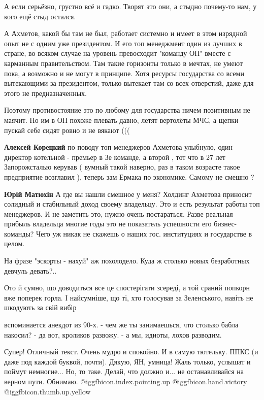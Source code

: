 \begin{itemize}
А если серьёзно, грустно всё и гадко. Творят это они, а стыдно почему-то нам, у
кого ещё стыд остался.

А Ахметов, какой бы там не был, работает системно и имеет в этом изрядной опыт
не с одним уже президентом. И его топ менеджмент один из лучших в стране, во
всяком случае на уровень превосходит "команду ОП" вместе с карманным
правительством. Там такие горизонты только в мечтах, не умеют пока, а возможно
и не могут в принципе. Хотя ресурсы государства со всеми вытекающими за
президентом, только вытекает там со всех отверстий, даже для этого не
предназначенных.

Поэтому противостояние это по любому для государства ничем позитивным не
маячит. Но им в ОП похоже плевать давно, летят вертолёты МЧС, а щепки пускай
себе сидят ровно и не вякают (((

\begin{itemize} %
\textbf{Алексей Корецкий} по поводу топ менеджеров Ахметова улыбнуло, один директор котельной - премьер в Зе команде, а второй , тот что в 27 лет Запорожсталью керував ( вумный такой наверно, раз в таком возрасте такое предприятие возглавил ), теперь зам Ермака по экономике. Самому не смешно ?

\textbf{Юрій Матюхін}
А где вы нашли смешное у меня?
Холдинг Ахметова приносит солидный и стабильный доход своему владельцу. Это и есть результат работы топ менеджеров. И не заметить это, нужно очень постараться. Разве реальная прибыль владельца многие годы это не показатель успешности его бизнес-команды?
Чего уж никак не скажешь о наших гос. институциях и государстве в целом.
\end{itemize} %

На фразе "эскорты - нахуй" аж похолодело. Куда ж столько новых безработных девчуль девать?..


Ото й сумно, що доводиться все це спостерігати зсереді, а той сраний попкорн
вже поперек горла. І найсумніше, що ті, хто голосував за Зеленського, навіть не
шкодують за свій вибір


вспоминается анекдот из 90-х.
- чем же ты занимаешься, что столько бабла накосил?
- да вот, кроликов развожу.
- а мы, идиоты, лохов разводим.


Супер! Отличный текст. Очень мудро и спокойно. И в самую тютельку. ППКС (и даже
под каждой буквой, почти). Дякую, ЯН, умница! Жаль только, услышат и поймут
немногие... Но, то таке. Делай, что должно и... не останавливайся на верном
пути. Обнимаю.  @igg{fbicon.index.pointing.up} ️@igg{fbicon.hand.victory} ️  @igg{fbicon.thumb.up.yellow} 


\end{itemize}
